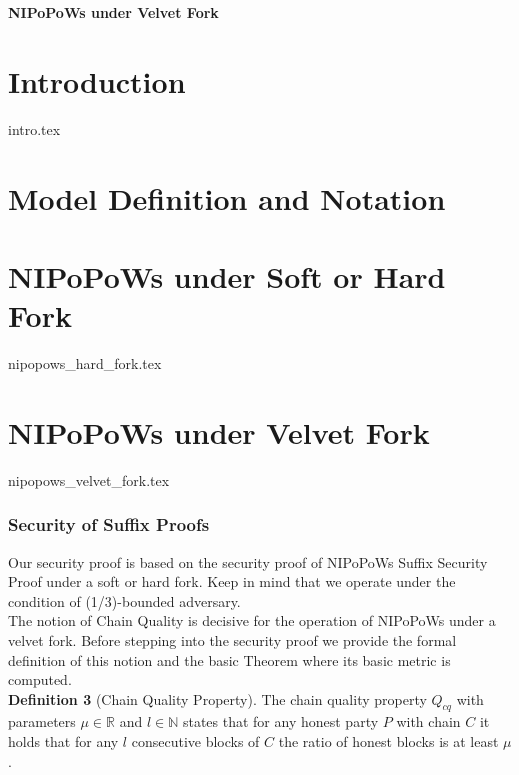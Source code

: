 \documentclass[11pt,a4paper]{article}
\begin{document}
\begin{center}
\begin{Large}
\textbf{NIPoPoWs under Velvet Fork\\}
\end{Large}

\end{center}

\section{Introduction}
{intro.tex}

\section{Model Definition and Notation}

\section{NIPoPoWs under Soft or Hard Fork}
{nipopows_hard_fork.tex}

\section{NIPoPoWs under Velvet Fork}
{nipopows_velvet_fork.tex}


\subsubsection{Security of Suffix Proofs}
Our security proof is based on the security proof of NIPoPoWs Suffix Security Proof under a soft or hard fork. Keep in mind that we operate under the condition of (1/3)-bounded adversary.\\

The notion of Chain Quality is decisive for the operation of NIPoPoWs under a velvet fork. Before stepping into the security proof we provide the formal definition of this notion and the basic Theorem where its basic metric is computed.\\

\textbf{Definition 3 }(Chain Quality Property)\cite{Backbone}. The chain quality property $Q_{cq}$ with parameters $\mu \in \mathbb{R}$ and $l \in \mathbb{N}$ states that for any honest party $P$ with chain $C$ it holds that for any $l $ consecutive blocks of $C$ the ratio of honest blocks is at least $\mu$.\\
\end{document}
